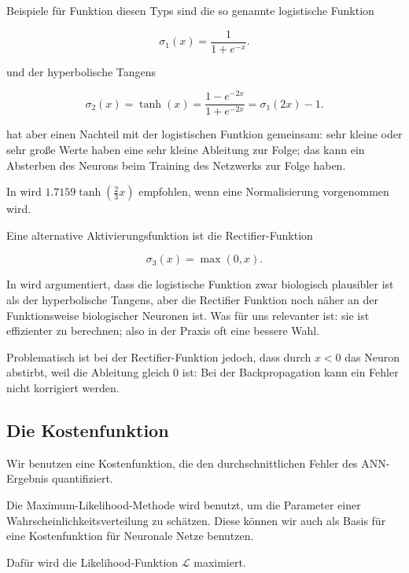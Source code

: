 Beispiele für Funktion diesen Typs sind die so genannte logistische Funktion

\begin{equation}
\sigma_1(x) = \frac{1}{1+e^{-x}}.
\end{equation}

und der hyperbolische Tangens

\begin{equation}
\sigma_2(x) = \tanh(x) = \frac{1-e^{-2x}}{1+e^{-2x}} = 
\sigma_1(2x) -1.
\end{equation}

hat aber einen Nachteil mit der logistischen Funtkion gemeinsam: sehr kleine oder sehr große Werte haben eine sehr kleine Ableitung zur Folge; das kann ein Absterben des Neurons beim Training des Netzwerks zur Folge haben. 

In \cite{lecunefficient} wird $1.7159 \tanh(\frac{2}{3} x)$ empfohlen, wenn eine Normalisierung vorgenommen wird. 

Eine alternative Aktivierungsfunktion ist die Rectifier-Funktion 

\begin{equation}
\sigma_3(x) = \max(0,x).
\end{equation} 

In \cite{glorot2011deep} wird argumentiert, dass die logistische Funktion zwar biologisch plausibler ist als der hyperbolische Tangens, aber die Rectifier Funktion noch näher an der Funktionsweise biologischer Neuronen ist. Was für uns relevanter ist: sie ist effizienter zu berechnen; also in der Praxis oft eine bessere Wahl. 

Problematisch ist bei der Rectifier-Funktion jedoch, dass durch $x < 0$ das Neuron abstirbt, weil die Ableitung gleich 0 ist: Bei der Backpropagation kann ein Fehler nicht korrigiert werden\cite{bengio2012practical}.


\subsection{Die Kostenfunktion}
Wir benutzen eine Kostenfunktion, die den durchschnittlichen Fehler des ANN-Ergebnis quantifiziert.


Die Maximum-Likelihood-Methode wird benutzt, um die Parameter einer Wahrscheinlichkeitsverteilung zu schätzen. Diese können wir auch als Basis für eine Kostenfunktion für Neuronale Netze benutzen.

Dafür wird die Likelihood-Funktion $\mathcal{L}$ maximiert.

